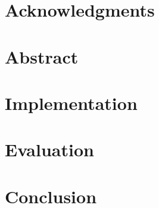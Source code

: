 \documentclass[a4paper,11pt,twoside,openright]{WCarticle}
\begin{document}

\tpage
\pagestyle{plain}

\chapter*{Acknowledgments}


\chapter*{Abstract} 

\tableofcontents
\listoffigures
\listoftables
\cleardoublepage
\pagestyle{fancy}
\iffalse
\chapter{Introduction} \label{chap:intro}\pagenumbering{arabic}



\chapter{Related Work} \label{chap:backgrd}




\chapter{Preliminaries} \label{chap:prelim}%



\chapter{Algorithm} \label{chap:alg}

\fi

\chapter{Implementation} \label{chap:impl}

\chapter{Evaluation} \label{chap:eval}


\chapter{Conclusion} \label{chap:conclusion}



\end{document}
